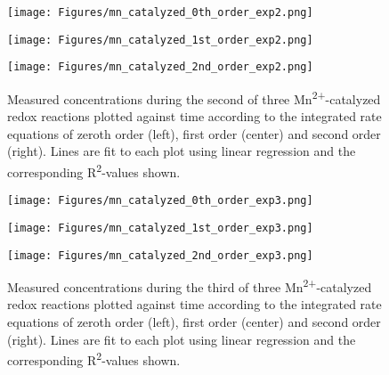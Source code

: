 \documentclass[titlepage]{article}
\begin{document}
\begin{figure}[H]
    \centering
    \begin{minipage}[c]{0.32\textwidth}
        \texttt{[image: Figures/mn\_catalyzed\_0th\_order\_exp2.png]}
    \end{minipage}
    \begin{minipage}[c]{0.32\textwidth}
        \texttt{[image: Figures/mn\_catalyzed\_1st\_order\_exp2.png]}
    \end{minipage}
    \begin{minipage}[c]{0.32\textwidth}
        \texttt{[image: Figures/mn\_catalyzed\_2nd\_order\_exp2.png]}
    \end{minipage}
    \caption{Measured concentrations during the second of three Mn\textsuperscript{2+}-catalyzed redox reactions plotted against time according to the integrated rate equations of zeroth order (left), first order (center) and second order (right). Lines are fit to each plot using linear regression and the corresponding R\textsuperscript{2}-values shown.}
    \label{fig_kmno_mn_catalyzed_rates_exp2}
\end{figure}
\begin{figure}[H]
    \centering
    \begin{minipage}[c]{0.32\textwidth}
        \texttt{[image: Figures/mn\_catalyzed\_0th\_order\_exp3.png]}
    \end{minipage}
    \begin{minipage}[c]{0.32\textwidth}
        \texttt{[image: Figures/mn\_catalyzed\_1st\_order\_exp3.png]}
    \end{minipage}
    \begin{minipage}[c]{0.32\textwidth}
        \texttt{[image: Figures/mn\_catalyzed\_2nd\_order\_exp3.png]}
    \end{minipage}
    \caption{Measured concentrations during the third of three Mn\textsuperscript{2+}-catalyzed redox reactions plotted against time according to the integrated rate equations of zeroth order (left), first order (center) and second order (right). Lines are fit to each plot using linear regression and the corresponding R\textsuperscript{2}-values shown.}
    \label{fig_kmno_mn_catalyzed_rates_exp3}
\end{figure}
\end{document}
